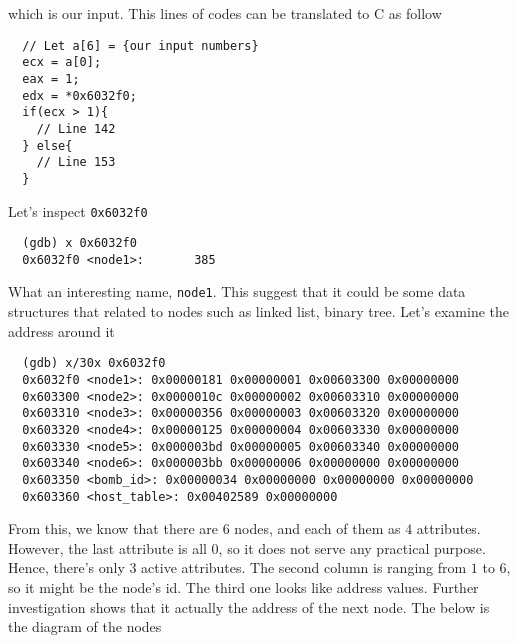 which is our input. This lines of codes can be translated to C as follow
{\renewcommand\fcolorbox[4][]{\textcolor{black}{\strut#4}}
\begin{verbatim}
  // Let a[6] = {our input numbers}
  ecx = a[0];
  eax = 1;
  edx = *0x6032f0;
  if(ecx > 1){
    // Line 142
  } else{
    // Line 153
  }
\end{verbatim}
}\noindent
Let's inspect \verb|0x6032f0|
{\renewcommand\fcolorbox[4][]{\textcolor{black}{\strut#4}}
\begin{verbatim}
  (gdb) x 0x6032f0
  0x6032f0 <node1>:       385
\end{verbatim}
}\noindent
What an interesting name, \verb|node1|. This suggest that it could be some data structures that related to nodes such as linked list, binary tree. Let's examine the address around it
{\renewcommand\fcolorbox[4][]{\textcolor{black}{\strut#4}}
\begin{verbatim}
  (gdb) x/30x 0x6032f0
  0x6032f0 <node1>: 0x00000181 0x00000001 0x00603300 0x00000000
  0x603300 <node2>: 0x0000010c 0x00000002 0x00603310 0x00000000
  0x603310 <node3>: 0x00000356 0x00000003 0x00603320 0x00000000
  0x603320 <node4>: 0x00000125 0x00000004 0x00603330 0x00000000
  0x603330 <node5>: 0x000003bd 0x00000005 0x00603340 0x00000000
  0x603340 <node6>: 0x000003bb 0x00000006 0x00000000 0x00000000
  0x603350 <bomb_id>: 0x00000034 0x00000000 0x00000000 0x00000000
  0x603360 <host_table>: 0x00402589 0x00000000
\end{verbatim}
}\noindent
From this, we know that there are $6$ nodes, and each of them as $4$ attributes. However, the last attribute is all $0$, so it does not serve any practical purpose. Hence, there's only $3$ active attributes. The second column is ranging from $1$ to $6$, so it might be the node's id. The third one looks like address values. Further investigation shows that it actually the address of the next node. The below is the diagram of the nodes

